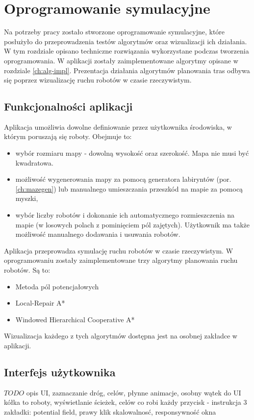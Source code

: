 \chapter{Oprogramowanie symulacyjne}
\label{ch:simulation-app}

Na potrzeby pracy zostało stworzone oprogramowanie symulacyjne, które posłużyło do przeprowadzenia testów algorytmów oraz wizualizacji ich działania.
W tym rozdziale opisano techniczne rozwiązania wykorzystane podczas tworzenia oprogramowania.
W aplikacji zostały zaimplementowane algorytmy opisane w rozdziale \ref{ch:alg-impl}.
Prezentacja działania algorytmów planowania tras odbywa się poprzez wizualizację ruchu robotów w czasie rzeczywistym. 

\section{Funkcjonalności aplikacji}
Aplikacja umożliwia dowolne definiowanie przez użytkownika środowiska, w którym poruszają się roboty. Obejmuje to:
\begin{itemize}
	\item wybór rozmiaru mapy - dowolną wysokość oraz szerokość. Mapa nie musi być kwadratowa.
	\item możliwość wygenerowania mapy za pomocą generatora labiryntów (por. \ref{ch:mazegen}) lub manualnego umieszczania przeszkód na mapie za pomocą myszki,
	\item wybór liczby robotów i dokonanie ich automatycznego rozmieszczenia na mapie (w losowych polach z pominięciem pól zajętych). Użytkownik ma także możliwość manualnego dodawania i usuwania robotów.
\end{itemize}

Aplikacja przeprowadza symulację ruchu robotów w czasie rzeczywistym. W oprogramowaniu zostały zaimplementowane trzy algorytmy planowania ruchu robotów. Są to:
\begin{itemize}
	\item Metoda pól potencjałowych
	\item Local-Repair A*
	\item Windowed Hierarchical Cooperative A*
\end{itemize}
Wizualizacja każdego z tych algorytmów dostępna jest na osobnej zakładce w aplikacji.

\section{Interfejs użytkownika}
$TODO$ opis UI, zaznaczanie dróg, celów, płynne animacje, osobny wątek do UI
kółka to roboty, wyświetlanie ścieżek, celów
co robi każdy przycisk - instrukcja
3 zakładki: potential field, 
prawy klik
skalowalnosć, responsywność okna

